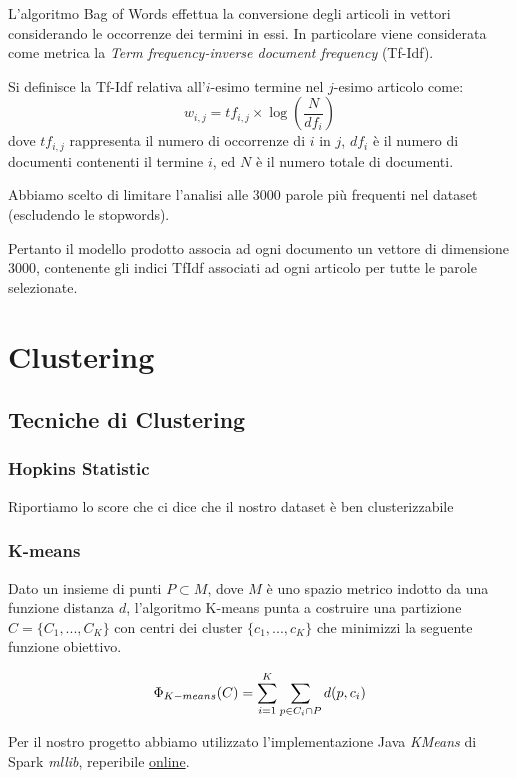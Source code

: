 \documentclass[
	11pt, %
	a4paper, %
	oneside, %
	headinclude,footinclude, %
	BCOR5mm, %
]{scrartcl}
\begin{document}
	L'algoritmo Bag of Words\cite{bagofwords} effettua la conversione degli articoli in vettori considerando le occorrenze dei termini in essi.
	In particolare viene considerata come metrica la \textit{Term frequency-inverse document frequency} (Tf-Idf).

	Si definisce la Tf-Idf relativa all'$i$-esimo termine nel $j$-esimo articolo come:
	$$ w_{i,j}=tf_{i,j}\times\log \left(\frac{N}{df_{i}} \right) $$
	dove $tf_{i,j}$ rappresenta il numero di occorrenze di $i$ in $j$, $df_{i}$ è il numero di documenti contenenti il termine $i$, ed $N$ è il numero totale di documenti.

	Abbiamo scelto di limitare l'analisi alle 3000 parole pi\`{u} frequenti nel dataset (escludendo le stopwords).

	Pertanto il modello prodotto associa ad ogni documento un vettore di dimensione 3000, contenente gli indici TfIdf associati ad ogni articolo per tutte le parole selezionate.

\section{Clustering}

	\subsection{Tecniche di Clustering}

		\subsubsection{Hopkins Statistic}
			Riportiamo lo score che ci dice che il nostro dataset è ben clusterizzabile

		\subsubsection{K-means}
			Dato un insieme di punti $P \subset M$, dove $M$ è uno spazio metrico indotto da una funzione distanza $d$, l'algoritmo K-means punta a costruire una partizione $C = \{ C_1, ..., C_K \}$ con centri dei cluster $\{ c_1, ..., c_K\}$ che minimizzi la seguente funzione obiettivo.

			\begin{equation}
				\Phi_{K-means} (C) = \sum_{i=1}^K \sum_{p \in C_i \cap P} d(p, c_i) \\
			\end{equation}

			Per il nostro progetto abbiamo utilizzato l'implementazione Java \emph{KMeans} di Spark \emph{mllib}, reperibile \href{https://spark.apache.org/docs/2.1.0/mllib-clustering.html#k-means}{online}.
\end{document}
